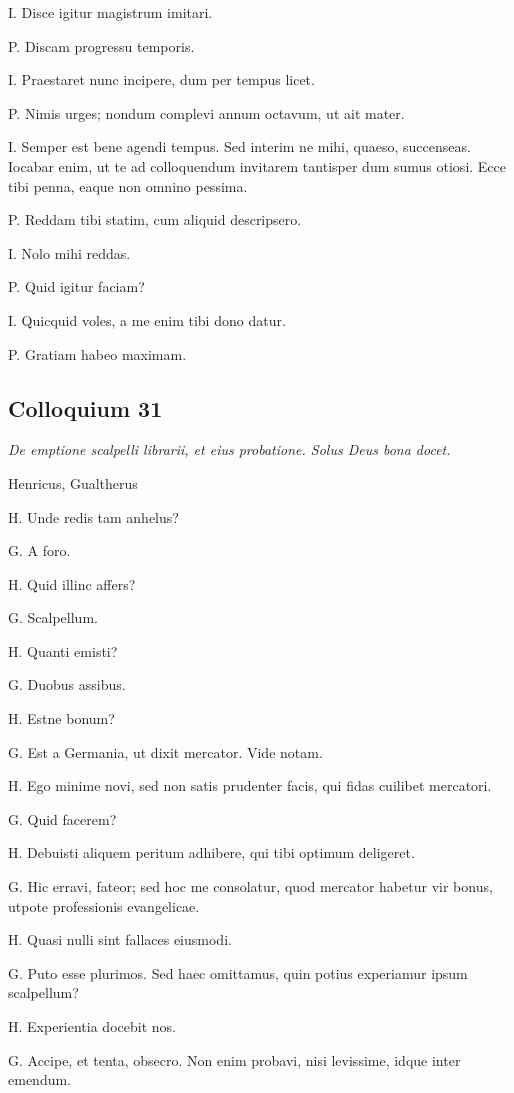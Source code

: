 \documentclass{article}
\begin{document}
I. Disce igitur magistrum imitari.

P. Discam progressu temporis.

I. Praestaret nunc incipere, dum per tempus licet.

P. Nimis urges; nondum complevi annum octavum, ut ait mater.

I. Semper est bene agendi tempus. Sed interim ne mihi, quaeso, succenseas. Iocabar enim, ut te ad colloquendum invitarem tantisper dum sumus otiosi. Ecce tibi penna, eaque non omnino pessima.

P. Reddam tibi statim, cum aliquid descripsero.

I. Nolo mihi reddas.

P. Quid igitur faciam?

I. Quicquid voles, a me enim tibi dono datur.

P. Gratiam habeo maximam.

\subsection{Colloquium 31}
\emph{De emptione scalpelli librarii, et eius probatione. Solus Deus bona docet.}

Henricus, Gualtherus

H. Unde redis tam anhelus?

G. A foro.

H. Quid illinc affers?

G. Scalpellum.

H. Quanti emisti?

G. Duobus assibus.

H. Estne bonum?

G. Est a Germania, ut dixit mercator. Vide notam.

H. Ego minime novi, sed non satis prudenter facis, qui fidas cuilibet mercatori.

G. Quid facerem?

H. Debuisti aliquem peritum adhibere, qui tibi optimum deligeret.

G. Hic erravi, fateor; sed hoc me consolatur, quod mercator habetur vir bonus, utpote professionis evangelicae.

H. Quasi nulli sint fallaces eiusmodi.

G. Puto esse plurimos. Sed haec omittamus, quin potius experiamur ipsum scalpellum?

H. Experientia docebit nos.

G. Accipe, et tenta, obsecro. Non enim probavi, nisi levissime, idque inter emendum.
\end{document}

